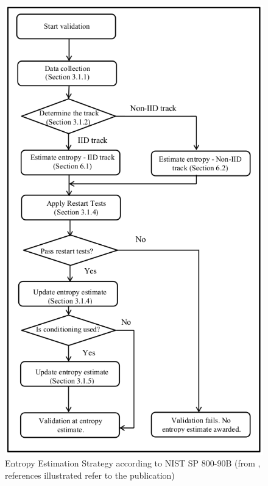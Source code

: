 \begin{figure}[H]
	\label{fig:entropy-est-strategy}
	\centering
	\includegraphics[scale=0.6]{img/nsp800-90b-entropy-est-strategy.png}
	\caption{Entropy Estimation Strategy according to NIST SP 800-90B (from \cite{turan2018nist}, references illustrated refer to the publication)}
\end{figure}




